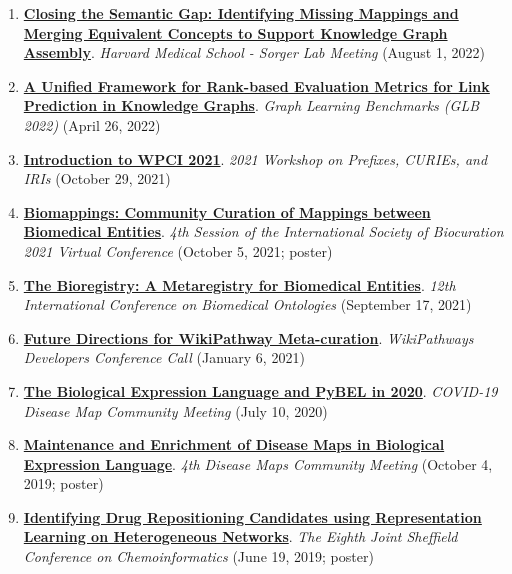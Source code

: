 \documentclass[10pt,a4paper,sans]{moderncv} %
\begin{document}
\begin{enumerate}
    \item \textbf{\href{https://bit.ly/sorger-lab-biomappings}{Closing the Semantic Gap: Identifying Missing Mappings and Merging Equivalent Concepts to Support Knowledge Graph Assembly}}. \textit{Harvard Medical School - Sorger Lab Meeting} (August 1, 2022)

    \item \textbf{\href{https://bit.ly/glb2022-ranking-metrics}{A Unified Framework for Rank-based Evaluation Metrics for Link Prediction in Knowledge Graphs}}. \textit{Graph Learning Benchmarks (GLB 2022)} (April 26, 2022)

    \item \textbf{\href{https://bit.ly/WPCI2021}{Introduction to WPCI 2021}}. \textit{2021 Workshop on Prefixes, CURIEs, and IRIs} (October 29, 2021)

    \item \textbf{\href{https://f1000research.com/posters/10-1005}{Biomappings: Community Curation of Mappings between Biomedical Entities}}. \textit{4th Session of the International Society of Biocuration 2021 Virtual Conference} (October 5, 2021; poster)

    \item \textbf{\href{https://www.youtube.com/watch?v=9Pf5wr8JxCQ&t=1s}{The Bioregistry: A Metaregistry for Biomedical Entities}}. \textit{12th International Conference on Biomedical Ontologies} (September 17, 2021)

    \item \textbf{\href{https://docs.google.com/presentation/d/1C8T3XVOL8GiZ68WBXXSnI3SVjhd2aSBuVLXVPPGqKTw/edit?usp=sharing}{Future Directions for WikiPathway Meta-curation}}. \textit{WikiPathways Developers Conference Call} (January 6, 2021)

    \item \textbf{\href{https://docs.google.com/presentation/d/18ntRMvO3Q9KTX87xoLOIgqAW3iiUvxJsfEmaFh1-52A/edit?usp=sharing}{The Biological Expression Language and PyBEL in 2020}}. \textit{COVID-19 Disease Map Community Meeting} (July 10, 2020)

    \item \textbf{\href{https://doi.org/10.6084/m9.figshare.9917753.v3}{Maintenance and Enrichment of Disease Maps in Biological Expression Language}}. \textit{4th Disease Maps Community Meeting} (October 4, 2019; poster)

    \item \textbf{\href{https://doi.org/10.6084/m9.figshare.8288822.v2}{Identifying Drug Repositioning Candidates using Representation Learning on Heterogeneous Networks}}. \textit{The Eighth Joint Sheffield Conference on Chemoinformatics} (June 19, 2019; poster)


\end{enumerate}
\end{document}
